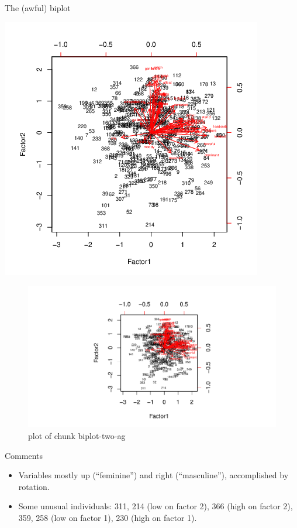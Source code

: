 \documentclass[ignorenonframetext,]{beamer}
\begin{document}
\begin{frame}{The (awful) biplot}
\protect\hypertarget{the-awful-biplot}{}

\includegraphics{bFactor-biplot-two-again.png}

\begin{figure}
\centering
\includegraphics{figure/biplot-two-ag-1.pdf}
\caption{plot of chunk biplot-two-ag}
\end{figure}

\end{frame}

\begin{frame}{Comments}
\protect\hypertarget{comments-30}{}

\begin{itemize}
\item
  Variables mostly up (``feminine'') and right (``masculine''),
  accomplished by rotation.
\item
  Some unusual individuals: 311, 214 (low on factor 2), 366 (high on
  factor 2), 359, 258 (low on factor 1), 230 (high on factor 1).
\end{itemize}

\end{frame}
\end{document}
